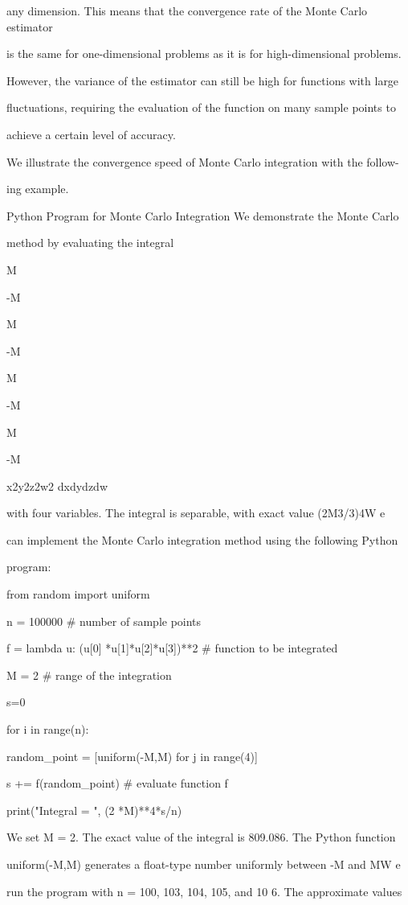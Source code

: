 any dimension. This means that the convergence rate of the Monte Carlo estimator

is the same for one-dimensional problems as it is for high-dimensional problems.

However, the variance of the estimator can still be high for functions with large

fluctuations, requiring the evaluation of the function on many sample points to

achieve a certain level of accuracy.

We illustrate the convergence speed of Monte Carlo integration with the follow-

ing example.

Python Program for Monte Carlo Integration We demonstrate the Monte Carlo

method by evaluating the integral

\int M

-M

\int M

-M

\int M

-M

\int M

-M

x2y2z2w2 dxdydzdw

with four variables. The integral is separable, with exact value (2M3/3)4W e

can implement the Monte Carlo integration method using the following Python

program:

from random import uniform

n = 100000 # number of sample points

f = lambda u: (u[0] *u[1]*u[2]*u[3])**2 # function to be integrated

M = 2 # range of the integration

s=0

for i in range(n):

random_point = [uniform(-M,M) for j in range(4)]

s += f(random_point) # evaluate function f

print("Integral = ", (2 *M)**4*s/n)

We set M = 2. The exact value of the integral is 809.086. The Python function

uniform(-M,M) generates a float-type number uniformly between -M and MW e

run the program with n = 100, 103, 104, 105, and 10 6. The approximate values

